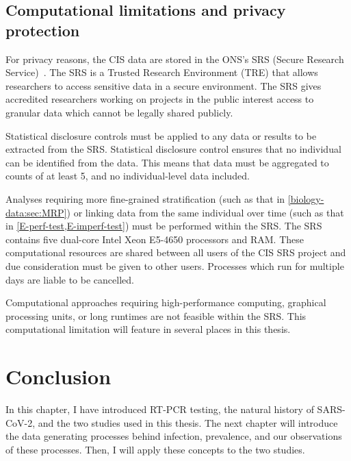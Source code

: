 \documentclass[thesis.tex]{subfiles}
\begin{document}
\subsection{Computational limitations and privacy protection} \label{biology-data:sec:SRS}

For privacy reasons, the CIS data are stored in the ONS's SRS (Secure Research Service)~\autocite{onsSRS}.
The SRS is a Trusted Research Environment (TRE) that allows researchers to access sensitive data in a secure environment.
The SRS gives accredited researchers working on projects in the public interest access to granular data which cannot be legally shared publicly.

Statistical disclosure controls must be applied to any data or results to be extracted from the SRS.
Statistical disclosure control ensures that no individual can be identified from the data.
This means that data must be aggregated to counts of at least 5, and no individual-level data included.

Analyses requiring more fine-grained stratification (such as that in \cref{biology-data:sec:MRP}) or linking data from the same individual over time (such as that in \cref{E-perf-test,E-imperf-test}) must be performed within the SRS.
The SRS contains five  dual-core Intel Xeon E5-4650 processors and  RAM.
These computational resources are shared between all users of the CIS SRS project and due consideration must be given to other users.
Processes which run for multiple days are liable to be cancelled.

Computational approaches requiring high-performance computing, graphical processing units, or long runtimes are not feasible within the SRS.
This computational limitation will feature in several places in this thesis.

\section{Conclusion}

In this chapter, I have introduced RT-PCR testing, the natural history of SARS-CoV-2, and the two studies used in this thesis.
The next chapter will introduce the data generating processes behind infection, prevalence, and our observations of these processes.
Then, I will apply these concepts to the two studies.


\ifSubfilesClassLoaded{
  \listoftodos
}{}
\end{document}
